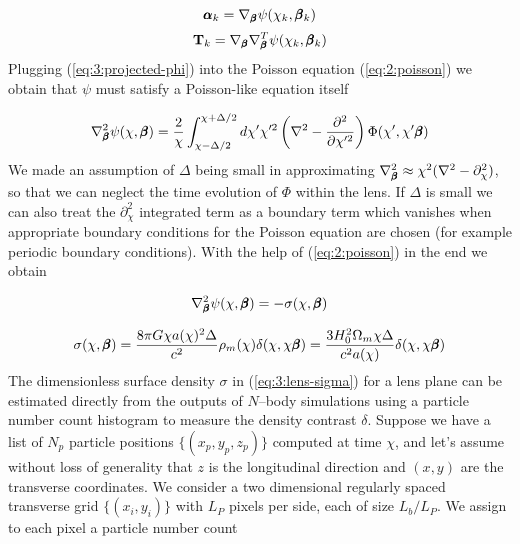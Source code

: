 \begin{equation}
\label{eq:3:alphak-psi}
\pmb{\alpha}_k = \nabla_{\pmb{\beta}}\psi(\chi_k,\pmb{\beta}_k)
\end{equation}
%
\begin{equation}
\label{eq:3:Tk-psi}
\mathbf{T}_k = \nabla_{\pmb{\beta}}\nabla^T_{\pmb{\beta}}\psi(\chi_k,\pmb{\beta}_k)
\end{equation}
%
Plugging (\ref{eq:3:projected-phi}) into the Poisson equation (\ref{eq:2:poisson}) we obtain that $\psi$ must satisfy a Poisson-like equation itself

\begin{equation}
\label{eq:3:poisson-psi-1}
\nabla^2_{\pmb{\beta}}\psi(\chi,\pmb{\beta}) = \frac{2}{\chi}\int_{\chi-\Delta/2}^{\chi+\Delta/2}d\chi' \chi'^2\left(\nabla^2-\frac{\partial^2}{\partial \chi'^2}\right)\Phi(\chi',\chi'\pmb{\beta})
\end{equation}
%
We made an assumption of $\Delta$ being small in approximating $\nabla^2_{\pmb{\beta}}\approx \chi^2(\nabla^2-\partial_\chi^2)$, so that we can neglect the time evolution of $\Phi$ within the lens. If $\Delta$ is small we can also treat the $\partial^2_\chi$ integrated term as a boundary term which vanishes when appropriate boundary conditions for the Poisson equation are chosen (for example periodic boundary conditions). With the help of (\ref{eq:2:poisson}) in the end we obtain

\begin{equation}
\label{eq:3:poisson-psi-2}
\nabla^2_{\pmb{\beta}}\psi(\chi,\pmb{\beta}) = -\sigma(\chi,\pmb{\beta})  
\end{equation} 

\begin{equation}
\label{eq:3:lens-sigma}
\sigma(\chi,\pmb{\beta}) = \frac{8\pi G \chi a(\chi)^2\Delta}{c^2}\rho_m(\chi)\delta(\chi,\chi\pmb{\beta}) = \frac{3H_0^2\Omega_m\chi\Delta}{c^2 a(\chi)}\delta(\chi,\chi\pmb{\beta})
\end{equation}
%
The dimensionless surface density $\sigma$ in (\ref{eq:3:lens-sigma}) for a lens plane can be estimated directly from the outputs of $N$--body simulations using a particle number count histogram to measure the density contrast $\delta$. Suppose we have a list of $N_p$ particle positions $\{(x_p,y_p,z_p)\}$ computed at time $\chi$, and let's assume without loss of generality that $z$ is the longitudinal direction and $(x,y)$ are the transverse coordinates. We consider a two dimensional regularly spaced transverse grid $\{(x_i,y_i)\}$ with $L_P$ pixels per side, each of size $L_b/L_P$. We assign to each pixel a particle number count

